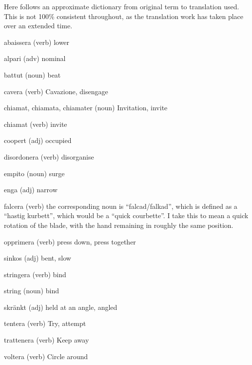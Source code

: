 \newpage
{}

Here follows an approximate dictionary from original term to translation used. This is not 100\% consistent throughout, as the translation work has taken place over an extended time.

\begin{description}
\item{abaissera} (verb) lower
\item{alpari} (adv) nominal
\item{battut} (noun) beat
\item{cavera} (verb) Cavazione, disengage
\item{chiamat, chiamata, chiamater} (noun) Invitation, invite
\item{chiamat} (verb) invite
\item{coopert} (adj) occupied
\item{disordonera} (verb) disorganise
\item{empito} (noun) surge
\item{enga} (adj) narrow
\item{falcera} (verb) the corresponding noun is ``falcad/falkad'', which is defined as a ``hastig kurbett'', which would be a ``quick courbette''. I take this to mean a quick rotation of the blade, with the hand remaining in roughly the same position.
\item{opprimera} (verb) press down, press together
\item{sinkos} (adj) bent, slow
\item{stringera} (verb) bind
\item{string} (noun) bind
\item{skränkt} (adj) held at an angle, angled
\item{tentera} (verb) Try, attempt
\item{trattenera} (verb) Keep away
\item{voltera} (verb) Circle around
\end{description}
